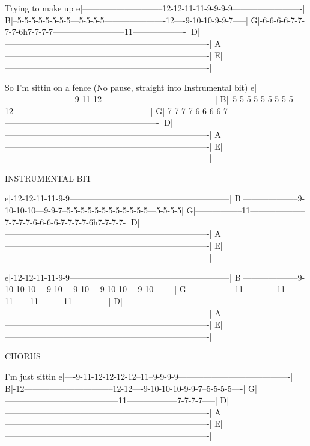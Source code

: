                                Trying to make up
e|-----------------------------12-12-11-11-9-9-9-9-------------------------|
B|--5-5-5-5-5-5-5-5---5-5-5-5----------------------12----9-10-10-9-9-7-----|
G|-6-6-6-6-7-7-7-7-6h7-7-7-7--------------------------11-------------------|
D|-------------------------------------------------------------------------|
A|-------------------------------------------------------------------------|
E|-------------------------------------------------------------------------|

   So I'm sittin on a fence  (No pause, straight into Instrumental bit)
e|-------------------------9-11-12-----------------------------------------|
B|--5-5-5-5-5-5-5-5-5---12-------------------------------------------------|
G|-7-7-7-7-6-6-6-6-7-------------------------------------------------------|
D|-------------------------------------------------------------------------|
A|-------------------------------------------------------------------------|
E|-------------------------------------------------------------------------|

INSTRUMENTAL BIT

e|-12-12-11-11-9-9---------------------------------------------------------|
B|--------------------9-10-10-10---9-9-7--5-5-5-5-5-5-5-5-5-5-5-5---5-5-5-5|
G|-----------------11--------------------7-7-7-7-6-6-6-6-7-7-7-7-6h7-7-7-7-|
D|-------------------------------------------------------------------------|
A|-------------------------------------------------------------------------|
E|-------------------------------------------------------------------------|

e|-12-12-11-11-9-9---------------------------------------------------------|
B|--------------------9-10-10-10----9-10----9-10----9-10-10----9-10--------|
G|-----------------11------------11------11------11---------11-------------|
D|-------------------------------------------------------------------------|
A|-------------------------------------------------------------------------|
E|-------------------------------------------------------------------------|

CHORUS

               I'm just sittin
e|----9-11-12-12-12-12--11--9-9-9-9----------------------------------------|
B|-12--------------------------------12-12----9-10-10-10-9-9-7--5-5-5-5----|
G|-----------------------------------------11------------------7-7-7-7-----|
D|-------------------------------------------------------------------------|
A|-------------------------------------------------------------------------|
E|-------------------------------------------------------------------------|

